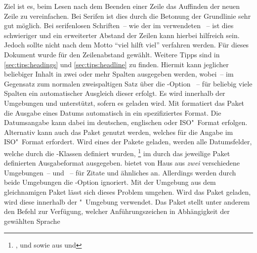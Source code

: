 \begin{DeclarePackages}
  Ziel ist es, beim Lesen nach dem Beenden einer Zeile das Auffinden der neuen 
  Zeile zu vereinfachen. Bei Serifen ist dies durch die Betonung der Grundlinie 
  sehr gut möglich. Bei serifenlosen Schriften~-- wie der im \TUDCD verwendeten 
  \OpenSans~-- ist dies schwieriger und ein erweiterter Abstand der Zeilen kann 
  hierbei hilfreich sein. Jedoch sollte nicht nach dem Motto 
  \enquote{viel hilft viel} verfahren werden. Für dieses Dokument wurde 
   für den Zeilenabstand gewählt. 
  Weitere Tipps sind in \autoref{sec:tips:headings} und 
  \autoref{sec:tips:headline} zu finden.
  Hiermit kann jeglicher beliebiger Inhalt in zwei oder mehr Spalten ausgegeben 
  werden, wobei~-- im Gegensatz zum normalen zweispaltigen Satz über die
  \KOMAScript-Option ~-- für beliebig viele Spalten ein 
  automatischer Ausgleich dieser erfolgt. Es wird innerhalb der Umgebungen 
   und  unterstützt, sofern es 
  geladen wird.
  Mit  formatiert das Paket  
  die Ausgabe eines Datums automatisch in ein spezifiziertes Format. Die 
  Datumsangabe kann dabei im deutschen, englischen oder ISO"~Format erfolgen. 
  Alternativ kann auch das Paket  genutzt werden, welches 
  für  die Angabe im ISO"~Format erfordert. 
  Wird eines der Pakete geladen, werden alle Datumsfelder, welche durch die 
  \TUDScript-Klassen definiert wurden,%
  \footnote{%
    ,  und  sowie aus 
      und %
  }
  im durch das jeweilige Paket definierten Ausgabeformat ausgegeben.
   bietet von Haus aus \emph{zwei} verschiedene Umgebungen~-- 
   und ~-- für Zitate und ähnliches 
  an. Allerdings werden durch beide Umgebungen die \KOMAScript-Option 
   ignoriert. Mit der Umgebung  aus 
  dem gleichnamigen Paket lässt sich dieses Problem umgehen. Wird das Paket 
  geladen, wird diese innerhalb der "~Umgebung verwendet.
  Das Paket stellt unter anderem den Befehl  zur 
  Verfügung, welcher Anführungszeichen in Abhängigkeit der gewählten Sprache 

\end{DeclarePackages}
